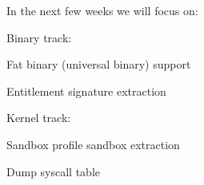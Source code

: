 
In the next few weeks we will focus on:

\begin{description}
    \item Binary track:
            \begin{description}
                \item Fat binary (universal binary) support
                \item Entitlement signature extraction
            \end{description}
    \item Kernel track:
            \begin{description}
                \item Sandbox profile sandbox extraction
                \item Dump syscall table
            \end{description}
\end{description}
